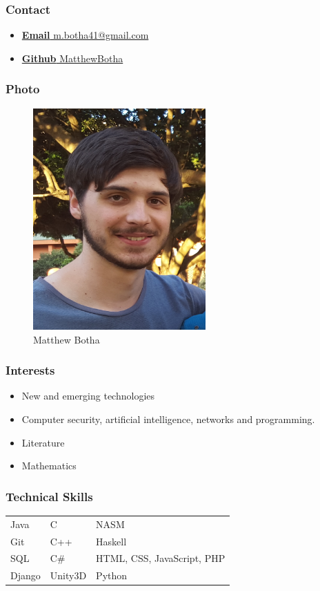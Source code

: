 \documentclass{article}
\begin{document}
\subsubsection{Contact}
\begin{itemize}
	\item \href{mailto:m.botha41@gmail.com}{\textbf{Email} m.botha41@gmail.com}
	\item \href{https://github.com/MatthewBotha}{\textbf{Github} MatthewBotha}
\end{itemize}
\subsubsection{Photo}
\begin{figure}[H]
	\centering
	\includegraphics[width=250px]{../Matt.jpg}
	\caption{Matthew Botha}
\end{figure}
\subsubsection{Interests}
\begin{itemize}
	\item New and emerging technologies
	\item Computer security, artificial intelligence, networks and programming.
	\item Literature
	\item Mathematics
\end{itemize}

\subsubsection{Technical Skills}
\begin{tabular}{| l | l | l |}
	Java   & C		& NASM                        \\
	Git    & C++      & Haskell                     \\
	SQL    & C\#	& HTML, CSS, JavaScript, PHP   \\
	Django & Unity3D	& Python	
\end{tabular}
\end{document}
